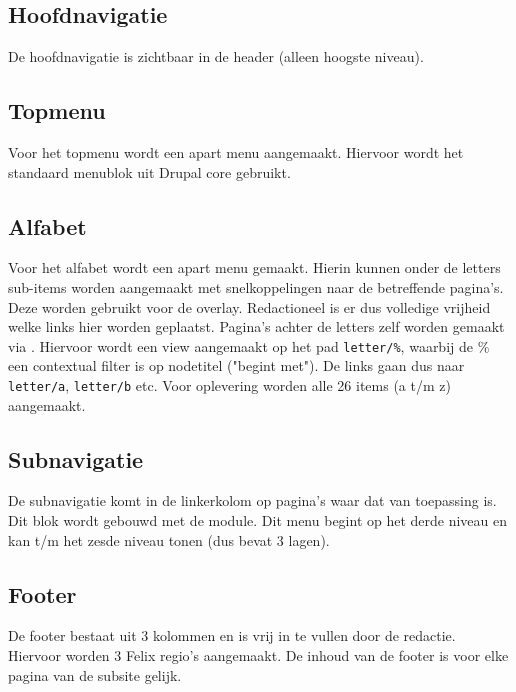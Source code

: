 
\subsection{Hoofdnavigatie}

De hoofdnavigatie is zichtbaar in de header (alleen hoogste niveau).

\subsection{Topmenu}

Voor het topmenu wordt een apart menu aangemaakt. Hiervoor wordt het standaard menublok uit Drupal core gebruikt.

\subsection{Alfabet}

Voor het alfabet wordt een apart menu gemaakt. Hierin kunnen onder de letters sub-items worden aangemaakt met snelkoppelingen naar de betreffende pagina's. Deze worden gebruikt voor de overlay. Redactioneel is er dus volledige vrijheid welke links hier worden geplaatst. Pagina's achter de letters zelf worden gemaakt via . Hiervoor wordt een view aangemaakt op het pad \texttt{letter/\%}, waarbij de \% een contextual filter is op nodetitel ("begint met"). De links gaan dus naar \texttt{letter/a}, \texttt{letter/b} etc. Voor oplevering worden alle	 26 items (a t/m z) aangemaakt.

\subsection{Subnavigatie}

De subnavigatie komt in de linkerkolom op pagina's waar dat van toepassing is. Dit blok wordt gebouwd met de  module. Dit menu begint op het derde niveau en kan t/m het zesde niveau tonen (dus bevat 3 lagen).

\subsection{Footer}

De footer bestaat uit 3 kolommen en is vrij in te vullen door de redactie. Hiervoor worden 3 Felix regio's aangemaakt. De inhoud van de footer is voor elke pagina van de subsite gelijk.

